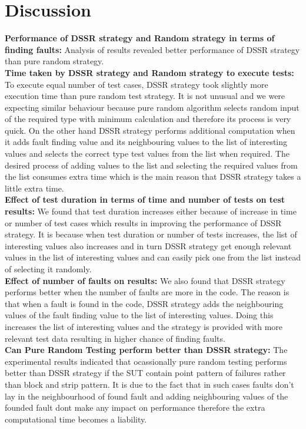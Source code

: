 \section{Discussion}

\textbf{Performance of DSSR strategy and Random strategy in terms of finding faults:} 
Analysis of results revealed better performance of DSSR strategy than pure random strategy. \\

\textbf{Time taken by DSSR strategy and Random strategy to execute tests:}
To execute equal number of test cases, DSSR strategy took slightly more execution time than pure random test strategy. It is not unusual and we were expecting similar behaviour because pure random algorithm selects random input of the required type with minimum calculation and therefore its process is very quick. On the other hand DSSR strategy performs additional computation when it adds fault finding value and its neighbouring values to the list of interesting values and selects the correct type test values from the list when required. The desired process of adding values to the list and selecting the required values from the list consumes extra time which is the main reason that DSSR strategy takes a little extra time.\\

\textbf{Effect of test duration in terms of time and number of tests on test results:} 
We found that test duration increases either because of  increase in time or number of test cases which results in improving the performance of DSSR strategy. It is because when test duration or number of tests increases, the list of interesting values also increases and in turn DSSR strategy get enough relevant values in the list of interesting values and can easily pick one from the list instead of selecting it randomly.\\

\textbf{Effect of number of faults on results:} 
We also found that DSSR strategy performs better when the number of faults are more in the code. The reason is that when a fault is found in the code, DSSR strategy adds the neighbouring values of the fault finding value to the list of interesting values. Doing this increases the list of interesting values and the strategy is provided with more relevant test data resulting in higher chance of finding faults.\\

\textbf{Can Pure Random Testing perform better than DSSR strategy:}
The experimental results indicated that ocassionally pure random testing performs better than DSSR strategy if the SUT contain point pattern of failures rather than block and strip pattern. It is due to the fact that in such cases faults don't lay in the neighbourhood of found fault and adding neighbouring values of the founded fault dont make any impact on performance therefore the extra computational time becomes a liability.\\


